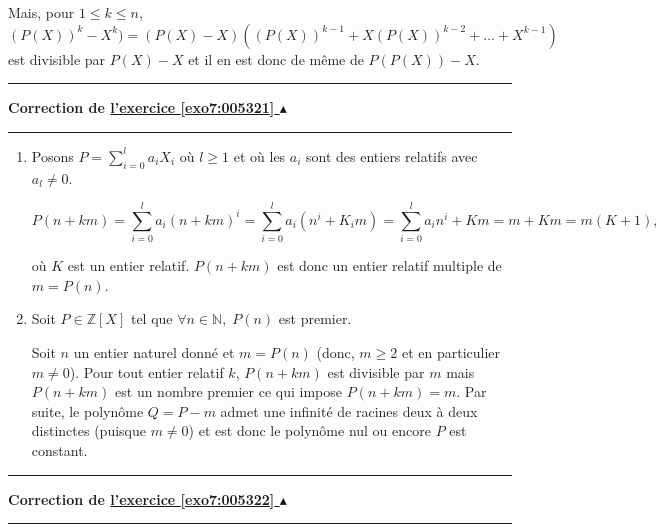 \documentclass[11pt,a4paper]{article}
\newcommand{\Nn}{\mathbb{N}} \newcommand{\N}{\mathbb{N}}
\newcommand{\Zz}{\mathbb{Z}} \newcommand{\Z}{\mathbb{Z}}
\newcounter{exo}
\newcommand{\correction}[1]{\hypertarget{cor7:#1}{}\label{cor7:#1}{\bf Correction de \hyperlink{exo7:#1}{l'exercice \ref{exo7:#1} $\blacktriangle$}}\vspace{1mm}\hrule\vspace{1mm}}
\newcommand{\fincorrection}{\vspace{1mm}\hrule\vspace*{7mm}}
\begin{document}
Mais, pour $1\leq k\leq n$, $(P(X))^k-X^k)=(P(X)-X)((P(X))^{k-1}+X(P(X))^{k-2}+...+X^{k-1})$ est divisible par $P(X)-X$ et il en est donc de même de $P(P(X))-X$.
\fincorrection
\correction{005321}
\begin{enumerate}
\item  Posons $P=\sum_{i=0}^{l}a_iX_i$ où $l\geq1$ et où les $a_i$ sont des entiers relatifs avec $a_l\neq0$.

$$P(n+km)=\sum_{i=0}^{l}a_i(n+km)^i=\sum_{i=0}^{l}a_i(n^i+K_im)=\sum_{i=0}^{l}a_in^i+Km=m+Km=m(K+1),$$

où $K$ est un entier relatif. $P(n+km)$ est donc un entier relatif multiple de $m=P(n)$.

\item  Soit $P\in\Zz[X]$ tel que $\forall n\in\Nn,\;P(n)$ est premier.

Soit $n$ un entier naturel donné et $m=P(n)$ (donc, $m\geq2$ et en particulier $m\neq0$). Pour tout entier relatif $k$, $P(n+km)$ est divisible par $m$ mais $P(n+km)$ est un nombre premier ce qui impose $P(n+km)=m$. Par suite, le polynôme $Q=P-m$ admet une infinité de racines deux à deux distinctes (puisque $m\neq0$) et est donc le polynôme nul ou encore $P$ est constant.
\end{enumerate}
\fincorrection
\correction{005322}
\end{document}
